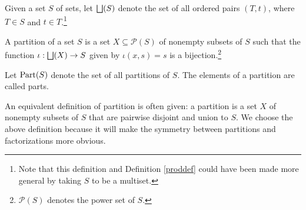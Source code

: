 \documentclass[authordate,onecolumn]{miri-tech-article}
\begin{document}
\begin{definition}
Given a set $S$ of sets, let $\bigsqcup(S)$ denote the set of all ordered pairs $(T,t)$, where $T\in S$ and $t\in T$.\footnote{Note that this definition and Definition \ref{proddef} could have been made more general by taking $S$ to be a multiset.}
\end{definition}
\begin{definition}[partition]
A partition of a set $S$ is a set $X\subseteq \mathcal{P}(S)$ of nonempty subsets of $S$ such that the function $\iota:\bigsqcup(X)\rightarrow S$ given by $\iota(x,s)=s$ is a bijection.\footnote{$\mathcal{P}(S)$ denotes the power set of $S$.}

Let $\text{Part}(S)$ denote the set of all partitions of $S$. The elements of a partition are called parts.
\end{definition}

An equivalent definition of partition is often given: a partition is a set $X$ of nonempty subsets of $S$ that are pairwise disjoint and union to $S$. We choose the above definition because it will make the symmetry between partitions and factorizations more obvious.
\end{document}
